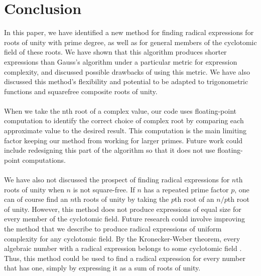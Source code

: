 \documentclass{article}
\begin{document}
\section{Conclusion}
    In this paper, we have identified a new method for finding radical expressions for roots of unity with prime degree, as well as for general members of the cyclotomic field of these roots. We have shown that this algorithm produces shorter expressions than Gauss's algorithm under a particular metric for expression complexity, and discussed possible drawbacks of using this metric. We have also discussed this method's flexibility and potential to be adapted to trigonometric functions and squarefree composite roots of unity.\\
    \\
    When we take the nth root of a complex value, our code uses floating-point computation to identify the correct choice of complex root by comparing each approximate value to the desired result. This computation is the main limiting factor keeping our method from working for larger primes. Future work could include redesigning this part of the algorithm so that it does not use floating-point computations.\\
    \\
    We have also not discussed the prospect of finding radical expressions for $ n $th roots of unity when $ n $ is not square-free. If $ n $ has a repeated prime factor $ p $, one can of course find an $ n $th roots of unity by taking the $ p $th root of an $ n/p $th root of unity. However, this method does not produce expressions of equal size for every member of the cyclotomic field. Future research could involve improving the method that we describe to produce radical expressions of uniform complexity for any cyclotomic field. By the Kronecker-Weber theorem, every algebraic number with a radical expression belongs to some cyclotomic field \cite{kwt}. Thus, this method could be used to find a radical expression for every number that has one, simply by expressing it as a sum of roots of unity.\\
\end{document}
